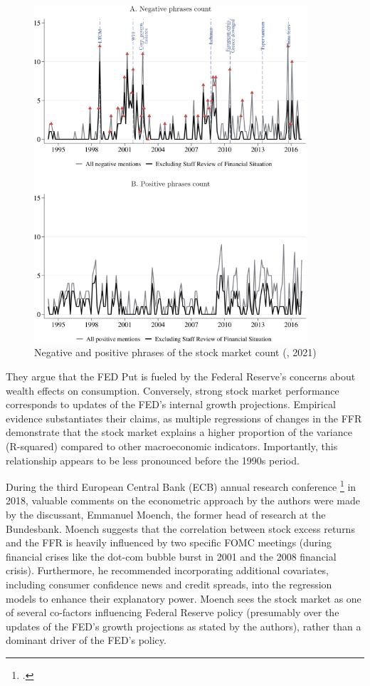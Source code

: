 \begin{figure}[h]
    \centering
        \label{cies21_fig5}
    \includegraphics[width=0.9\textwidth]{figures/cies21/Figure5}
    \caption{Negative and positive phrases of the stock market count (\cite{cieslak_economics_2021}, 2021)}
\end{figure}

They argue that the FED Put is fueled by the Federal Reserve's concerns about wealth effects on consumption. Conversely, strong stock market performance corresponds to updates of the FED’s internal growth projections. Empirical evidence substantiates their claims, as multiple regressions of changes in the FFR demonstrate that the stock market explains a higher proportion of the variance (R-squared) compared to other macroeconomic indicators. Importantly, this relationship appears to be less pronounced before the 1990s period.  

During the third European Central Bank (ECB) annual research conference \footcite{european_central_bank_third_2018} in 2018, valuable comments on the econometric approach by the authors were made by the discussant, Emmanuel Moench, the former head of research at the Bundesbank. Moench suggests that the correlation between stock excess returns and the FFR is heavily influenced by two specific FOMC meetings (during financial crises like the dot-com bubble burst in 2001 and the 2008 financial crisis). Furthermore, he recommended incorporating additional covariates, including consumer confidence news and credit spreads, into the regression models to enhance their explanatory power. Moench sees the stock market as one of several co-factors influencing Federal Reserve policy (presumably over the updates of the FED's growth projections as stated by the authors), rather than a dominant driver of the FED's policy.


